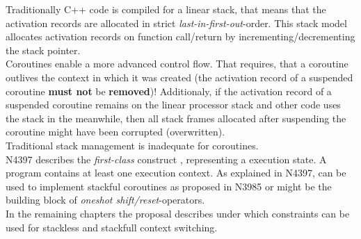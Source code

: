 Traditionally C++ code is compiled for a linear stack, that means that the
activation records are allocated in strict \emph{last-in-first-out}-order. This
stack model allocates activation records on function call/return by
incrementing/decrementing the stack pointer.\\
Coroutines enable a more advanced control flow. That requires, that a coroutine
outlives the context in which it was created (the activation record of a
suspended coroutine {\bfseries must not} be {\bfseries removed})! Additionaly,
if the activation record of a suspended coroutine remains on the linear
processor stack and other code uses the stack in the meanwhile, then all stack
frames allocated after suspending the coroutine might have been corrupted
(overwritten).\\
Traditional stack management is inadequate for coroutines.\\
\newline
N4397\cite{N4397} describes the \emph{first-class} construct \ectx, representing
a execution state. A program contains at least one execution context. As
explained in N4397, \ectx can be used to implement stackful coroutines as
proposed in N3985\cite{N3985} or might be the building block of \emph{oneshot
shift/reset}-operators.\\
In the remaining chapters the proposal describes under which constraints \ectx
can be used for stackless and stackfull context switching.
